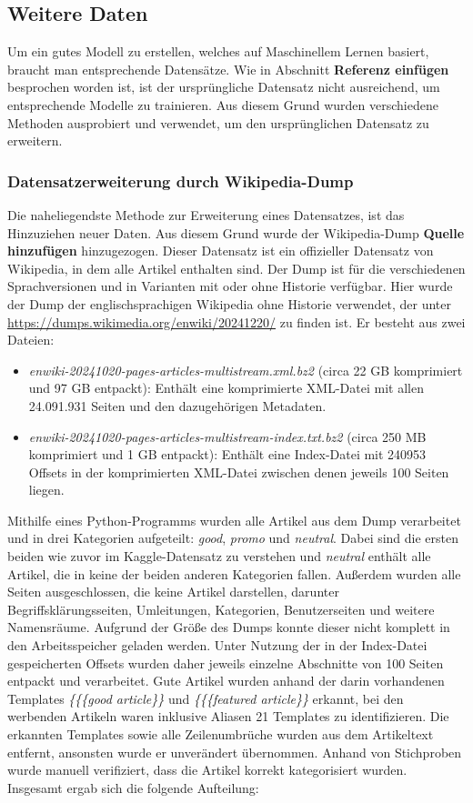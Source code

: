 \subsection{Weitere Daten}
Um ein gutes Modell zu erstellen, welches auf Maschinellem Lernen basiert, braucht man entsprechende Datensätze. Wie in Abschnitt \textbf{Referenz einfügen} besprochen worden ist, ist der ursprüngliche Datensatz nicht ausreichend, um entsprechende Modelle zu trainieren. Aus diesem Grund wurden verschiedene Methoden ausprobiert und verwendet, um den ursprünglichen Datensatz zu erweitern.

\subsubsection{Datensatzerweiterung durch Wikipedia-Dump}
\label{WPDump}
Die naheliegendste Methode zur Erweiterung eines Datensatzes, ist das Hinzuziehen neuer Daten. Aus diesem Grund wurde der Wikipedia-Dump \textbf{Quelle hinzufügen} hinzugezogen. Dieser Datensatz ist ein offizieller Datensatz von Wikipedia, in dem alle Artikel enthalten sind. Der Dump ist für die verschiedenen Sprachversionen und in Varianten mit oder ohne Historie verfügbar. Hier wurde der Dump der englischsprachigen Wikipedia ohne Historie verwendet, der unter \url{https://dumps.wikimedia.org/enwiki/20241220/} zu finden ist. Er besteht aus zwei Dateien:
\begin{itemize}
    \item \emph{enwiki-20241020-pages-articles-multistream.xml.bz2} (circa 22 GB komprimiert und 97 GB entpackt): Enthält eine komprimierte XML-Datei mit allen 24.091.931 Seiten und den dazugehörigen Metadaten.
    \item \emph{enwiki-20241020-pages-articles-multistream-index.txt.bz2} (circa 250 MB komprimiert und 1 GB entpackt): Enthält eine Index-Datei mit 240953 Offsets in der komprimierten XML-Datei zwischen denen jeweils 100 Seiten liegen.
\end{itemize}
Mithilfe eines Python-Programms wurden alle Artikel aus dem Dump verarbeitet und in drei Kategorien aufgeteilt: \emph{good}, \emph{promo} und \emph{neutral}. Dabei sind die ersten beiden wie zuvor im Kaggle-Datensatz zu verstehen und \emph{neutral} enthält alle Artikel, die in keine der beiden anderen Kategorien fallen. Außerdem wurden alle Seiten ausgeschlossen, die keine Artikel darstellen, darunter Begriffsklärungsseiten, Umleitungen, Kategorien, Benutzerseiten und weitere Namensräume. Aufgrund der Größe des Dumps konnte dieser nicht komplett in den Arbeitsspeicher geladen werden. Unter Nutzung der in der Index-Datei gespeicherten Offsets wurden daher jeweils einzelne Abschnitte von 100 Seiten entpackt und verarbeitet. Gute Artikel wurden anhand der darin vorhandenen Templates \textit{\{\{\{good article\}\}} und \textit{\{\{\{featured article\}\}} erkannt, bei den werbenden Artikeln waren inklusive Aliasen 21 Templates zu identifizieren. Die erkannten Templates sowie alle Zeilenumbrüche wurden aus dem Artikeltext entfernt, ansonsten wurde er unverändert übernommen. Anhand von Stichproben wurde manuell verifiziert, dass die Artikel korrekt kategorisiert wurden. Insgesamt ergab sich die folgende Aufteilung:
